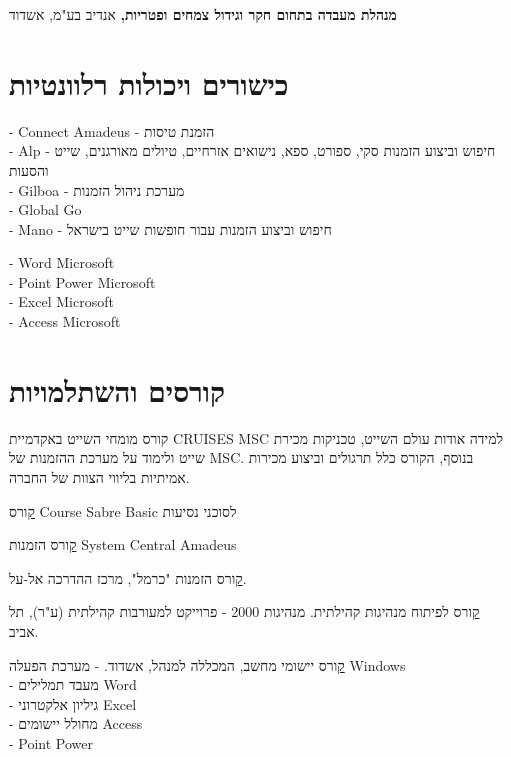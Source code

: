{\textbf{מנהלת מעבדה בתחום חקר וגידול צמחים ופטריות,} אנדיב בע"מ, אשדוד}
{}
{}

\section{כישורים ויכולות רלוונטיות}
	{- Connect Amadeus - הזמנת טיסות \\
		 - Alp - חיפוש וביצוע הזמנות סקי, ספורט, ספא, נישואים אזרחיים, טיולים מאורגנים,   שייט והסעות
		\\
		 - Gilboa - מערכת ניהול הזמנות \\
		 - Global Go \\
		 - Mano - חיפוש וביצוע הזמנות עבור חופשות שייט בישראל}{}{}
	 
{
- Word Microsoft\\
- Point Power Microsoft \\
- Excel Microsoft \\
- Access Microsoft 
 }
	 {}
	 {}

\section{קורסים והשתלמויות}

{קורס מומחי השייט באקדמיית CRUISES MSC}
{למידה אודות עולם השייט, טכניקות מכירת שייט ולימוד על מערכת ההזמנות של MSC. בנוסף, הקורס כלל תרגולים וביצוע מכירות אמיתיות בליווי הצוות של החברה.}
{}

{\href{https://raw.githubusercontent.com/kiril-u/k-resume-2021-1-template/main/references/basic-sabre-course.jpg}
	קורס Course Sabre Basic לסוכני נסיעות}
{}
{}

{\href{https://raw.githubusercontent.com/kiril-u/k-resume-2021-1-template/main/references/amadeus-central-system.jpg}
קורס הזמנות
System Central Amadeus
}
{}
{}

{\href{https://raw.githubusercontent.com/kiril-u/k-resume-2021-1-template/main/references/el-al-carmel.jpg}קורס הזמנות "כרמל", מרכז ההדרכה אל-על.}
{}
{}

{\href{https://raw.githubusercontent.com/kiril-u/k-resume-2021-1-template/main/references/communal-leadership-2.jpg}
	קורס לפיתוח מנהיגות קהילתית.}
{מנהיגות 2000 - פרוייקט למעורבות קהילתית (ע"ר), תל אביב.}
{}
{}

{
	\href{https://raw.githubusercontent.com/kiril-u/k-resume-2021-1-template/main/references/computer-programs-cert.jpg}
	קורס יישומי מחשב, המכללה למנהל, אשדוד.}
{- מערכת הפעלה Windows \\
- מעבד תמלילים Word \\
- גיליון אלקטרוני Excel \\
- מחולל יישומים Access \\
- Point Power}
{}
{}

